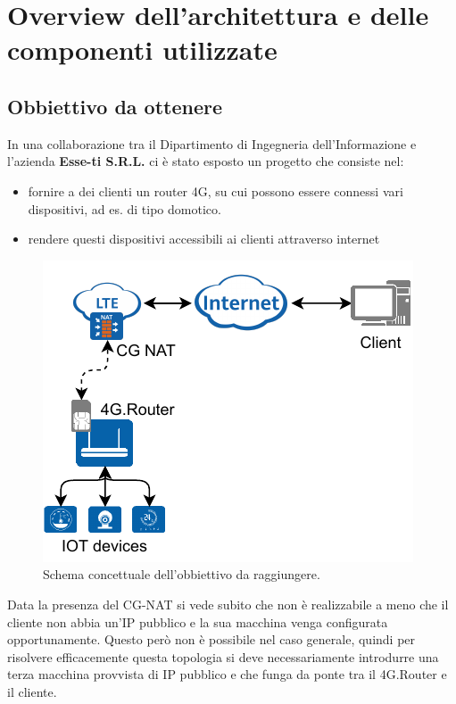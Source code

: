 

\chapter{Overview dell'architettura e delle componenti utilizzate}

\label{ch:overview}

\section{Obbiettivo da ottenere}

In una collaborazione tra il Dipartimento di Ingegneria dell'Informazione e l'azienda \textbf{Esse-ti S.R.L.} ci \`e stato esposto un progetto che consiste nel:

\begin{itemize}
	\item fornire a dei clienti un router 4G, su cui possono essere connessi vari dispositivi, ad es. di tipo domotico.
	\item rendere questi dispositivi accessibili ai clienti attraverso internet
\end{itemize}

\begin{figure}[H]
	\centering
	\includegraphics[width=0.5\linewidth]{immagini/diag-goal}
	\caption{Schema concettuale dell'obbiettivo da raggiungere. \cite{icons}}

	\label{fig:schema_concettuale}

\end{figure}

Data la presenza del CG-NAT si vede subito che non \`e realizzabile a meno che il cliente non abbia un'IP pubblico e la sua macchina venga configurata opportunamente. Questo per\`o non \`e possibile nel caso generale, quindi per risolvere efficacemente questa topologia si deve necessariamente introdurre una terza macchina provvista di IP pubblico e che funga da ponte tra il 4G.Router e il cliente.


